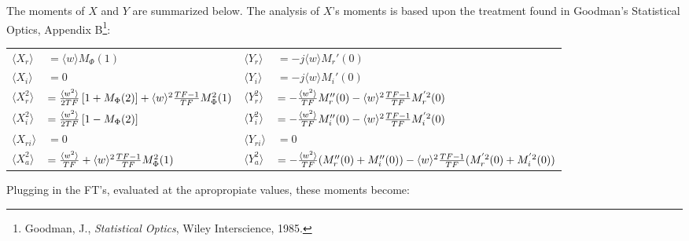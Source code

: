 The moments of $X$ and $Y$ are summarized below.  The analysis of
$X$'s moments is based upon the treatment found in Goodman's
Statistical Optics, Appendix B\footnote{Goodman, J., {\it Statistical Optics}, Wiley Interscience, 1985.}:

\vspace{-10pt}
\begin{center}
\begin{tabular}{llll}
$ \langle X_r\rangle $&$= \langle w\rangle M_\Phi(1)$ &
$ \langle Y_r\rangle  $&$ = -j\langle w\rangle M_r'(0)$ \\
$ \langle X_i\rangle $&$= 0$ &
$ \langle Y_i\rangle  $&$ = -j\langle w\rangle M_i'(0)$ \\
$ \langle X_r^2\rangle $&$= {\langle w^2\rangle \over2TF}\left[1+M_\Phi(2)\right] + \langle w\rangle ^2{TF-1\over TF}M_\Phi^2(1)$ &
$ \langle Y_r^2\rangle  $&$ = -{\langle w^2\rangle \over TF}M_r''(0) - \langle w\rangle ^2{TF-1\over TF}M_r^{'2}(0)$ \\
$ \langle X_i^2\rangle $&$= {\langle w^2\rangle \over2TF}\left[1-M_\Phi(2)\right]$ &
$ \langle Y_i^2\rangle  $&$ = -{\langle w^2\rangle \over TF}M_i''(0) - \langle w\rangle ^2{TF-1\over TF}M_i^{'2}(0)$ \\
$ \langle X_{ri}\rangle $&$= 0$ &
$ \langle Y_{ri}\rangle  $&$ = 0$ \\
$ \langle X_a^2\rangle $&$= {\langle w^2\rangle \over TF} + \langle w\rangle ^2{TF-1\over TF}M_\Phi^2(1)$ &
$ \langle Y_a^2\rangle  $&$ = -{\langle w^2\rangle \over TF}(M_r''(0)+M_i''(0)) - \langle w\rangle ^2{TF-1\over TF}(M_r^{'2}(0)+M_i^{'2}(0))$
\end{tabular}
\end{center}
\vspace{-10pt}

Plugging in the FT's, evaluated at the apropropiate values, these moments become:

